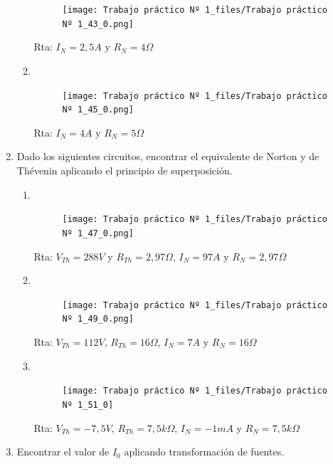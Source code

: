 \documentclass[10pt,a4paper]{article}
\begin{document}
\begin{enumerate}
\begin{enumerate}
\begin{figure}[H]
	\centering
	\texttt{[image: Trabajo práctico Nº 1\_files/Trabajo práctico Nº 1\_43\_0.png]}
	\label{e10a}
\end{figure}

Rta: $I_{N}=2,5A$ y $R_{N}=4\Omega$

	\item \

\begin{figure}[H]
	\centering
	\texttt{[image: Trabajo práctico Nº 1\_files/Trabajo práctico Nº 1\_45\_0.png]}
	\label{e10b}
\end{figure}

Rta: $I_{N}=4A$ y $R_{N}=5\Omega$

\end{enumerate}

\item Dado los siguientes circuitos, encontrar el equivalente de Norton y de Thévenin aplicando el principio de superposición.
\begin{enumerate}
	\item \
	\begin{figure}[H]
		\centering
		\texttt{[image: Trabajo práctico Nº 1\_files/Trabajo práctico Nº 1\_47\_0.png]}
		\label{e11a}
	\end{figure}
Rta: $V_{Th}=288V$ y $R_{Th}=2,97\Omega$, $I_{N}=97A$ y $R_{N}=2,97\Omega$
	\item \
		
		\begin{figure}[H]
		\centering
		\texttt{[image: Trabajo práctico Nº 1\_files/Trabajo práctico Nº 1\_49\_0.png]}
		\label{e11b}
	\end{figure}
Rta: $V_{Th}=112V$, $R_{Th}=16\Omega$, $I_{N}=7A$ y $R_{N}=16\Omega$
	\item \
		\begin{figure}[H]
		\centering
		\texttt{[image: Trabajo práctico Nº 1\_files/Trabajo práctico Nº 1\_51\_0]}
		\label{e11c}
	\end{figure}
	
	Rta: $V_{Th}=-7,5V$, $R_{Th}=7,5k\Omega$, $I_{N}=-1mA$ y $R_{N}=7,5k\Omega$

\end{enumerate}

\item  Encontrar el valor de $I_{0}$ aplicando transformación de fuentes.


\end{enumerate}
\end{document}
